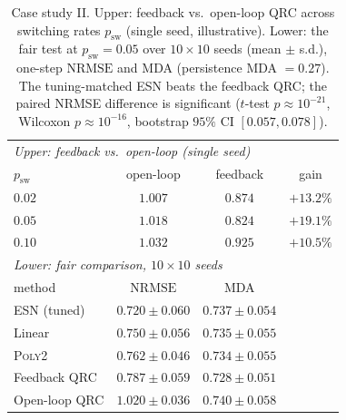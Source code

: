 \documentclass[11pt,a4paper]{article}
\newcommand{\nrmse}{\mathrm{NRMSE}}
\begin{document}
\begin{table}[H]
\centering
\caption{Case study II. Upper: feedback vs.\ open-loop QRC across switching
rates $p_{\mathrm{sw}}$ (single seed, illustrative). Lower: the fair test at
$p_{\mathrm{sw}}=0.05$ over $10\times10$ seeds (mean $\pm$ s.d.), one-step
$\nrmse$ and MDA (persistence MDA $=0.27$). The tuning-matched ESN beats the
feedback QRC; the paired NRMSE difference is significant
($t$-test $p\approx10^{-21}$, Wilcoxon $p\approx10^{-16}$, bootstrap $95\%$
CI $[0.057,0.078]$).}
\label{tab:fb}
\begin{tabular}{lccc}
\toprule
\multicolumn{4}{l}{\emph{Upper: feedback vs.\ open-loop (single seed)}}\\
$p_{\mathrm{sw}}$ & open-loop & feedback & gain \\
\midrule
$0.02$ & $1.007$ & $0.874$ & $+13.2\%$ \\
$0.05$ & $1.018$ & $0.824$ & $+19.1\%$ \\
$0.10$ & $1.032$ & $0.925$ & $+10.5\%$ \\
\midrule
\multicolumn{4}{l}{\emph{Lower: fair comparison, $10\times10$ seeds}}\\
method & $\nrmse$ & MDA & \\
\midrule
ESN (tuned)      & $0.720\pm0.060$ & $0.737\pm0.054$ & \\
Linear           & $0.750\pm0.056$ & $0.735\pm0.055$ & \\
\textsc{Poly2}   & $0.762\pm0.046$ & $0.734\pm0.055$ & \\
Feedback QRC     & $0.787\pm0.059$ & $0.728\pm0.051$ & \\
Open-loop QRC    & $1.020\pm0.036$ & $0.740\pm0.058$ & \\
\bottomrule
\end{tabular}
\end{table}
\end{document}
